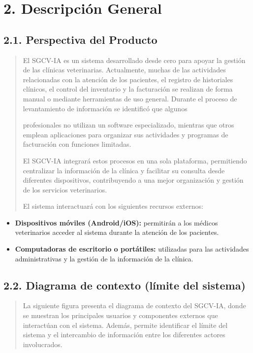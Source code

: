 \documentclass[
]{article}
\begin{document}
\section{2. Descripción General}\label{descripciuxf3n-general-1}

\subsection{2.1. Perspectiva del Producto}\label{perspectiva-del-producto}

\begin{quote}
El SGCV-IA es un sistema desarrollado desde cero para apoyar la gestión
de las clínicas veterinarias. Actualmente, muchas de las actividades
relacionadas con la atención de los pacientes, el registro de
historiales clínicos, el control del inventario y la facturación se
realizan de forma manual o mediante herramientas de uso general. Durante
el proceso de levantamiento de información se identificó que algunos

profesionales no utilizan un software especializado, mientras que otros
emplean aplicaciones para organizar sus actividades y programas de
facturación con funciones limitadas.

El SGCV-IA integrará estos procesos en una sola plataforma, permitiendo
centralizar la información de la clínica y facilitar su consulta desde
diferentes dispositivos, contribuyendo a una mejor organización y
gestión de los servicios veterinarios.

El sistema interactuará con los siguientes recursos externos:
\end{quote}

\begin{itemize}
\item
  \textbf{Dispositivos móviles (Android/iOS):} permitirán a los médicos
  veterinarios acceder al sistema durante la atención de los pacientes.
\item
  \textbf{Computadoras de escritorio o portátiles:} utilizadas para las
  actividades administrativas y la gestión de la información de la
  clínica.
\end{itemize}

\subsection{2.2. Diagrama de contexto (límite del
sistema)}\label{diagrama-de-contexto-luxedmite-del-sistema}

\begin{quote}
La siguiente figura presenta el diagrama de contexto del SGCV-IA, donde
se muestran los principales usuarios y componentes externos que
interactúan con el sistema. Además, permite identificar el límite del
sistema y el intercambio de información entre los diferentes actores
involucrados.
\end{quote}
\end{document}
